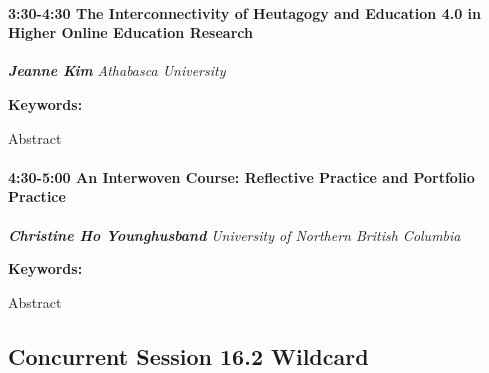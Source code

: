 \documentclass[
]{book}
\begin{document}
\begin{session}
\hypertarget{the-interconnectivity-of-heutagogy-and-education-4.0-in-higher-online-education-research}{%
\paragraph*{\texorpdfstring{3:30-4:30 \textbar{} \textbf{The
Interconnectivity of Heutagogy and Education 4.0 in Higher Online
Education} \textbar{}
Research}{3:30-4:30 \textbar{} The Interconnectivity of Heutagogy and Education 4.0 in Higher Online Education \textbar{} Research}}\label{the-interconnectivity-of-heutagogy-and-education-4.0-in-higher-online-education-research}}

\textbf{\emph{Jeanne Kim}} \textbar{} \emph{Athabasca University}

\textbf{Keywords:}

Abstract
\end{session}

\begin{session}
\hypertarget{an-interwoven-course-reflective-practice-and-portfolio-practice}{%
\paragraph*{\texorpdfstring{4:30-5:00 \textbar{} \textbf{An Interwoven
Course: Reflective Practice and Portfolio} \textbar{}
Practice}{4:30-5:00 \textbar{} An Interwoven Course: Reflective Practice and Portfolio \textbar{} Practice}}\label{an-interwoven-course-reflective-practice-and-portfolio-practice}}

\textbf{\emph{Christine Ho Younghusband}} \textbar{} \emph{University of
Northern British Columbia}

\textbf{Keywords:}

Abstract
\end{session}

\hypertarget{concurrent-session-16.2-wildcard}{%
\subsection*{Concurrent Session 16.2 \textbar{} Wildcard}\label{concurrent-session-16.2-wildcard}}
\end{document}
